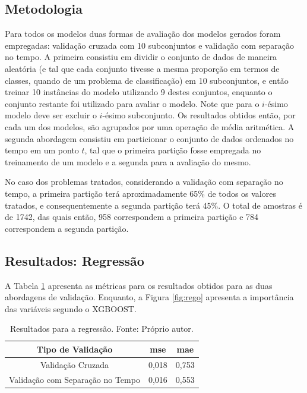 \subsection{Metodologia}

Para todos os modelos duas formas de avaliação dos modelos gerados foram empregadas: validação cruzada com 10 subconjuntos e validação com separação no tempo. A primeira consistiu em dividir o conjunto de dados de maneira aleatória (e tal que cada conjunto tivesse a mesma proporção em termos de classes, quando de um problema de classificação) em 10 subconjuntos, e então treinar 10 instâncias do modelo utilizando 9 destes conjuntos, enquanto o conjunto restante foi utilizado para avaliar o modelo. Note que para o $i$-ésimo modelo deve ser excluir o $i$-ésimo subconjunto. Os resultados obtidos então, por cada um dos modelos, são agrupados por uma operação de média aritmética. A segunda abordagem consistiu em particionar o conjunto de dados ordenados no tempo em um ponto $t$, tal que o primeira partição fosse empregada no treinamento de um modelo e a segunda para a avaliação do mesmo.

No caso dos problemas tratados, considerando a validação com separação no tempo, a primeira partição terá aproximadamente 65\% de todos os valores tratados, e consequentemente a segunda partição terá 45\%. O total de amostras é de 1742, das quais então, 958 correspondem a primeira partição e 784 correspondem a segunda partição.


\subsection{Resultados: Regressão}

A Tabela \ref{tab:results_reg} apresenta as métricas para os resultados obtidos para as duas abordagens de validação. Enquanto, a Figura \ref{fig:rego} apresenta a importância das variáveis segundo o XGBOOST.

\begin{table}[h]
\begin{center}
\begin{tabular}{|c|c|c|}
\hline
Tipo de Validação & mse       & mae   \\ \hline
Validação Cruzada                   & 0,018   & 0,753  \\ \hline
Validação com Separação no Tempo    & 0,016   & 0,553  \\ \hline
\end{tabular}
\end{center}
\vspace{12pt}
\caption{Resultados para a regressão. Fonte: Próprio autor.}
\label{tab:results_reg}
\end{table}

